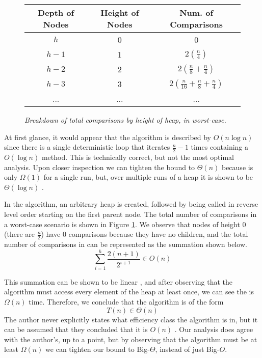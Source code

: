 \documentclass[11pt]{article}
\begin{document}
\begin{figure}[h]
\begin{center}
 \begin{tabular}{||c | c | c||} 
 \hline
 Depth of Nodes &  Height of Nodes & Num. of Comparisons \\ [0.5ex] 
 \hline
 \hline
 $h$ & 0 & 0 \\
 \hline 
 
 $h-1$ & 1 & $2(\frac{n}{4})$  \\ 
 \hline
 
 $h-2$ & 2 & $2(\frac{n}{8} + \frac{n}{4})$  \\
 \hline
 
 $h-3$ & 3 & $2(\frac{n}{16} + \frac{n}{8} + \frac{n}{4})$   \\
 \hline
 
 ... & ... & ...  \\
 \hline
\end{tabular}
\end{center}
\caption{\small \sl Breakdown of total comparisons by height of heap, in worst-case. \label{fig:tab}}
\end{figure}

At first glance, it would appear that the algorithm is described by $O(n \log n)$ since there is a single deterministic loop that iterates $\frac{n}{2} - 1$ times containing a $O(\log n)$ method. This is technically correct, but not the most optimal analysis. Upon closer inspection we can tighten the bound to $\Theta(n)$ because  is only $\Omega(1)$ for a single run, but, over multiple runs of a heap it is shown to be $\Theta(\log n)$ \cite{aocp}.

In the  algorithm, an arbitrary heap is created, followed by  being called in reverse level order starting on the first parent node. The total number of comparisons in a worst-case  scenario is shown in Figure \ref{fig:tab}. We observe that nodes of height 0 (there are $\frac{n}{2}$) have 0 comparisons because they have no children, and the total number of comparisons in  can be represented as the summation shown below.
\[
	\sum_{i=1}^{h}\frac{2(n+1)}{2^{i+1}} \in O(n)
\]


This summation can be shown to be linear \cite{beck}, and after observing that the algorithm must access every element of the heap at least once, we can see the  is $\Omega(n)$ time. Therefore, we conclude that the algorithm is of the form
\[
	T(n)\in \Theta(n)
\]
The author never explicitly states what efficiency class the algorithm is in, but it can be assumed that they concluded that it is $O(n)$ \cite[230]{levit}. Our analysis does agree with the author's, up to a point, but by observing that the algorithm must be at least $\Omega(n)$ we can tighten our bound to Big-$\Theta$, instead of just Big-$O$.
\end{document}
